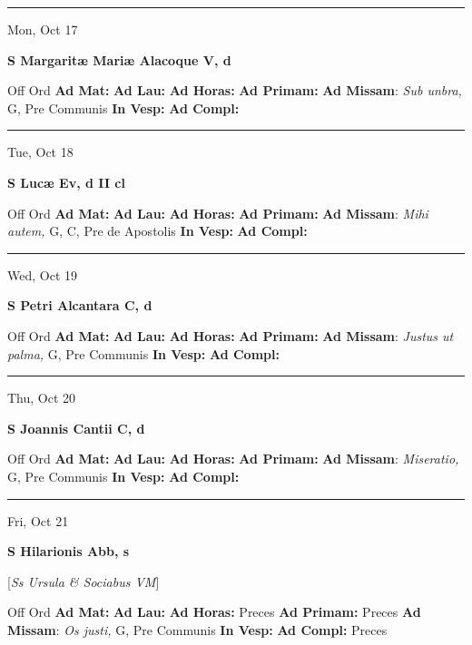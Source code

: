 \documentclass[letterpaper, 10pt]{article}
\begin{document}
\hrule
\begin{center}
Mon, Oct 17
\end{center}\textbf{ \large S Margaritæ Mariæ Alacoque V, \textnormal{\normalsize d}}
\begin{justify}
Off Ord
\textbf{Ad Mat: }
\textbf{Ad Lau: }
\textbf{Ad Horas: }
\textbf{Ad Primam: }
\textbf{Ad Missam}: \textit{Sub unbra,} G, Pre Communis
\textbf{In Vesp: }
\textbf{Ad Compl: }\end{justify}



\hrule
\begin{center}
Tue, Oct 18
\end{center}\textbf{ \large S Lucæ Ev, \textnormal{\normalsize d II cl}}
\begin{justify}
Off Ord
\textbf{Ad Mat: }
\textbf{Ad Lau: }
\textbf{Ad Horas: }
\textbf{Ad Primam: }
\textbf{Ad Missam}: \textit{Mihi autem,} G, C, Pre de Apostolis
\textbf{In Vesp: }
\textbf{Ad Compl: }\end{justify}



\hrule
\begin{center}
Wed, Oct 19
\end{center}\textbf{ \large S Petri Alcantara C, \textnormal{\normalsize d}}
\begin{justify}
Off Ord
\textbf{Ad Mat: }
\textbf{Ad Lau: }
\textbf{Ad Horas: }
\textbf{Ad Primam: }
\textbf{Ad Missam}: \textit{Justus ut palma,} G, Pre Communis
\textbf{In Vesp: }
\textbf{Ad Compl: }\end{justify}



\hrule
\begin{center}
Thu, Oct 20
\end{center}\textbf{ \large S Joannis Cantii C, \textnormal{\normalsize d}}
\begin{justify}
Off Ord
\textbf{Ad Mat: }
\textbf{Ad Lau: }
\textbf{Ad Horas: }
\textbf{Ad Primam: }
\textbf{Ad Missam}: \textit{Miseratio,} G, Pre Communis
\textbf{In Vesp: }
\textbf{Ad Compl: }\end{justify}



\hrule
\begin{center}
Fri, Oct 21
\end{center}\textbf{ \large S Hilarionis Abb, \textnormal{\normalsize s}}

[\textit{Ss Ursula \& Sociabus VM}]
\begin{justify}
Off Ord
\textbf{Ad Mat: }
\textbf{Ad Lau: }
\textbf{Ad Horas: }Preces
\textbf{Ad Primam: }Preces
\textbf{Ad Missam}: \textit{Os justi,} G, Pre Communis
\textbf{In Vesp: }
\textbf{Ad Compl: }Preces\end{justify}
\end{document}
